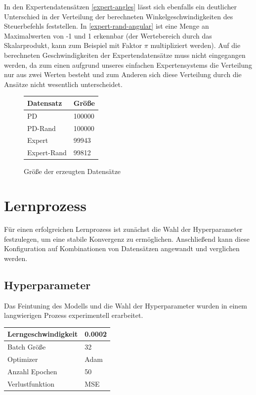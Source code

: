 In den Expertendatensätzen \ref{expert-angles} lässt sich ebenfalls ein deutlicher Unterschied in der Verteilung der berechneten Winkelgeschwindigkeiten des Steuerbefehls feststellen. In \ref{expert-rand-angular} ist eine Menge an Maximalwerten von -1 und 1 erkennbar (der Wertebereich durch das Skalarprodukt, kann zum Beispiel mit Faktor $\pi$ multipliziert werden).
Auf die berechneten Geschwindigkeiten der Expertendatensätze muss nicht eingegangen werden, da zum einen aufgrund unseres einfachen Expertensystems die Verteilung nur aus zwei Werten besteht und zum Anderen sich diese Verteilung durch die Ansätze nicht wesentlich unterscheidet.\\

\begin{figure}[H]
	\centering
	\begin{tabular}[t]{|l|l|}
		\hline
		\textbf{Datensatz} & \textbf{Größe} \\
		\hline
		PD & 100000 \\
		\hline
		PD-Rand & 100000 \\
		\hline
		Expert & 99943 \\
		\hline
		Expert-Rand & 99812 \\
		\hline
	\end{tabular}
	\caption{Größe der erzeugten Datensätze}
\end{figure}

\section{Lernprozess}

Für einen erfolgreichen Lernprozess ist zunächst die Wahl der Hyperparameter festzulegen, um eine stabile Konvergenz zu ermöglichen. Anschließend kann diese Konfiguration auf Kombinationen von Datensätzen angewandt und verglichen werden.

\subsection{Hyperparameter}

Das Feintuning des Modells und die Wahl der Hyperparameter wurden in einem langwierigen Prozess experimentell erarbeitet.
\begin{center}
	\begin{tabular}[t]{|l|l|}
		\hline
		Lerngeschwindigkeit & 0.0002 \\
		\hline
		Batch Größe & 32 \\
		\hline
		Optimizer & Adam \\
		\hline
		Anzahl Epochen & 50 \\
		\hline
		Verlustfunktion & MSE \\
		\hline
	\end{tabular}
\end{center}


